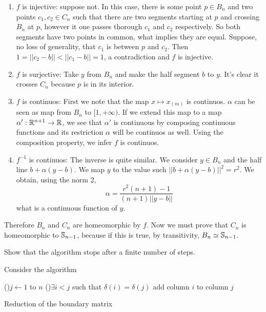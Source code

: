 \begin{enumerate}
    \item $f$ is injective: suppose not. In this case, there is some point $p
    \in B_n$ and two points $c_1, c_2 \in C_n$ such that there are two
    segments starting at $p$ and crossing $B_n$ at $p$, however it one passes
    thorough $c_1$ and $c_2$ respectively. So both segments have two points in
    common, what implies they are equal. Suppose, no loss of generality, that
    $c_1$ is between $p$ and $c_2$. Then $1 = ||c_2 - b|| < ||c_1 - b|| = 1$,
    a contradiction and $f$ is injective. 

    \item $f$ is surjective: Take $y$ from $B_n$ and make the half segment $b$ to $y$. It's clear
    it crosses $C_n$ because $p$ is in its interior.

    \item $f$ is continuos: First we note that the map $x \mapsto x_{(m)}$ is
    continuos. $\alpha$ can be seen as map from $B_n$ to $[1, + \infty)$. If
    we extend this map to a map $\alpha ' : \mathbb{R}^{n+1} \to \mathbb{R}$, we see that
    $\alpha '$ is continuous by composing continuous functions and its
    restriction $\alpha$ will be continuos as well. Using the composition
    property, we infer $f$ is continuos. 
    
    \item $f^{-1}$ is continuos: The inverse is quite similar. We consider $y
    \in B_n$ and the
    half line $b + \alpha(y - b)$. We map $y$ to the value such $||b +
    \alpha(y - b)||^2 = r^2$. We obtain, using the norm 2, 
    $$
    \alpha = \frac{r^2(n+1) -1}{(n+1)||y-b||}
    $$
    what is a continuous function of $y$. 

\end{enumerate}

Therefore $B_n$ and $C_n$ are homeomorphic by $f$. Now we must
prove that $C_n$ is homeomorphic to $\mathbb{S}_{n-1}$, because if this is true,
by transitivity, $B_n \simeq \mathbb{S}_{n-1}$. 

\noindent\linia

\begin{exercise}
    Show that the algorithm stops after a finite number of steps.
\end{exercise}

Consider the algorithm

\begin{algorithm}[H]
    \SetAlgoLined
     \For(){$j \leftarrow 1$ to $n$}{
        \While(){$\exists i < j$ such that $\delta(i) = \delta(j)$}{
            add column $i$ to column $j$
        }
     }
     \caption{Reduction of the boundary matrix}
    \end{algorithm}

